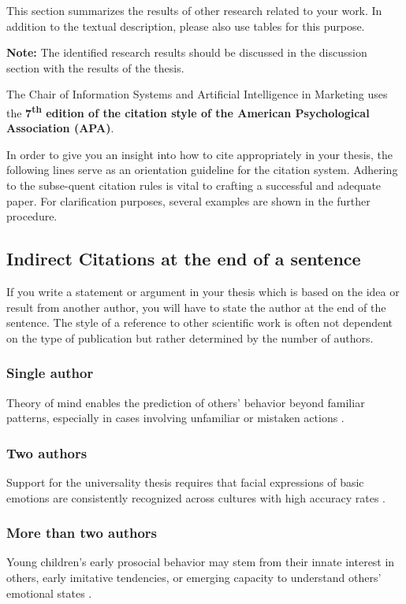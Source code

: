 This section summarizes the results of other research related to your work. In addition to the textual description, please also use tables for this purpose.

\textbf{Note:} The identified research results should be discussed in the discussion section with the results of the thesis.

The Chair of Information Systems and Artificial Intelligence in Marketing uses the \textbf{7\textsuperscript{th} edition of the citation style of the American Psychological Association (APA)}. 

In order to give you an insight into how to cite appropriately in your thesis, the following lines serve as an orientation guideline for the citation system. Adhering to the subse-quent citation rules is vital to crafting a successful and adequate paper. For clarification purposes, several examples are shown in the further procedure.

\subsection{Indirect Citations at the end of a sentence}
If you write a statement or argument in your thesis which is based on the idea or result from another author, you will have to state the author at the end of the sentence. The style of a reference to other scientific work is often not dependent on the type of publication but rather determined by the number of authors.

\subsubsection{Single author}
Theory of mind enables the prediction of others’ behavior beyond familiar patterns, especially in cases involving unfamiliar or mistaken actions \autocite{liszkowski_using_2013}.

\subsubsection{Two authors}
Support for the universality thesis requires that facial expressions of basic emotions are consistently recognized across cultures with high accuracy rates \autocite{nelson_universality_2013}.

\subsubsection{More than two authors}
Young children's early prosocial behavior may stem from their innate interest in others, early imitative tendencies, or emerging capacity to understand others' emotional states \autocite{svetlova_toddlers_2010}.


